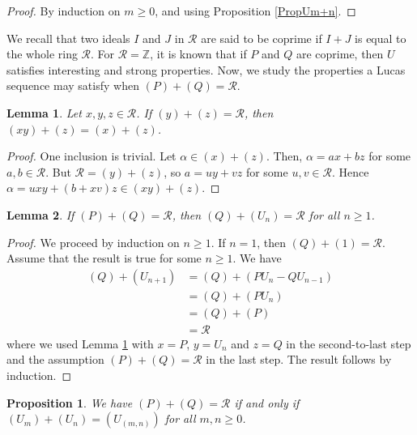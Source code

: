 \documentclass[reqno]{amsart}
\newtheorem{lemma}{Lemma}
\newtheorem{proposition}{Proposition}
\begin{document}
\begin{proof}
    By induction on $m\geq 0$, and using Proposition \ref{PropUm+n}.
\end{proof}


We recall that two ideals $I$ and $J$ in $\mathscr{R}$ are said to be coprime if $I+J$ is equal to the whole ring $\mathscr{R}$. For $\mathscr{R}=\mathbb{Z}$, it is known that if $P$ and $Q$ are coprime, then $U$ satisfies interesting and strong properties. Now, we study the properties a Lucas sequence may satisfy when $(P)+(Q)=\mathscr{R}$. 


\begin{lemma}\label{LemmaIdealsGen}
    Let $x,y,z\in \mathscr{R}$. If $(y)+(z)=\mathscr{R}$, then $(xy)+(z) = (x)+(z)$.
\end{lemma}

\begin{proof}
    One inclusion is trivial. Let $\alpha\in (x)+(z)$. Then, $\alpha=ax+bz$ for some $a,b\in \mathscr{R}$. But $\mathscr{R}=(y)+(z)$, so $a=uy+vz$ for some $u,v\in \mathscr{R}$. Hence $\alpha = uxy + (b+xv)z \in (xy)+(z)$.
\end{proof}



\begin{lemma}\label{LemmaQUn=R}
    If $(P)+(Q)=\mathscr{R}$, then $(Q)+(U_n)=\mathscr{R}$ for all $n\geq 1$.
\end{lemma}

\begin{proof}
    We proceed by induction on $n\geq 1$. If $n=1$, then $(Q)+(1)=\mathscr{R}$. Assume that the result is true for some $n\geq 1$. We have
    \begin{align*}
        (Q)+(U_{n+1}) &= (Q) + (PU_n-QU_{n-1}) \\
        &= (Q) +(PU_n) \\
        &= (Q)+(P) \\
        &=\mathscr{R}
    \end{align*}
    where we used Lemma \ref{LemmaIdealsGen} with $x=P$, $y=U_n$ and $z=Q$ in the second-to-last step and the assumption $(P)+(Q)=\mathscr{R}$ in the last step. The result follows by induction.
\end{proof}


\begin{proposition}\label{PropStrongDivSeq}
    We have $(P)+(Q)=\mathscr{R}$ if and only if $(U_m)+(U_n)=(U_{(m,n)})$ for all $m,n\geq 0$.
\end{proposition}
\end{document}
